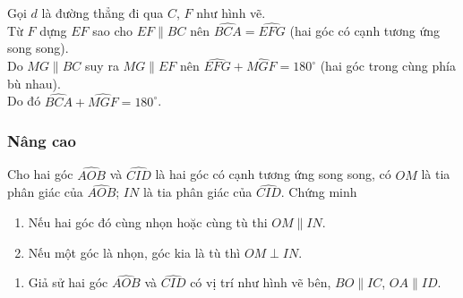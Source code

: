 \begin{bt}
{\begin{enumerate}
Gọi $d$ là đường thẳng đi qua  $C$, $F$ như hình vẽ.\\
Từ $F$ dựng $EF$ sao cho $EF\parallel BC$ nên $\widehat{BCA} = \widehat{EFG}$ (hai góc có cạnh tương ứng song song).\\
Do $MG\parallel BC$ suy ra $MG\parallel EF$ nên $\widehat{EFG} + \widehat{MGF} = 180^{\circ}$ (hai góc trong cùng phía bù nhau).\\
Do đó $\widehat{BCA} + \widehat{MGF}  = 180^{\circ}$.
\end{enumerate}
}
\end{bt}


\subsubsection{Nâng cao}
\begin{bt}%
Cho hai góc $\widehat{AOB}$ và $\widehat{CID}$ là hai góc có cạnh tương ứng song song, có $OM$ là tia phân giác của $\widehat{AOB}$; $IN$ là tia phân giác của $\widehat{CID}$. Chứng minh  
\begin{enumerate}
	\item Nếu hai góc đó cùng nhọn hoặc cùng tù thi $OM\parallel IN$.
	\item Nếu một góc là nhọn, góc kia là tù thì $OM\perp IN$.
\end{enumerate}
	\loigiai
	{\begin{enumerate}
				\item Giả sử hai góc $\widehat{AOB}$ và $\widehat{CID}$ có vị trí như hình vẽ bên,  $BO\parallel IC$, $OA\parallel ID$.
\end{enumerate}}
\end{bt}
